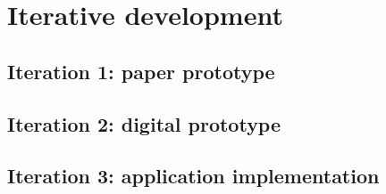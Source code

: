 \chapter{Iterative development}\label{chapter:prototype}

\section{Iteration 1: paper prototype}\label{chapter:prototype:section:paper}



\section{Iteration 2: digital prototype}\label{chapter:prototype:section:digital}



\section{Iteration 3: application implementation}\label{chapter:prototype:section:implementation}


